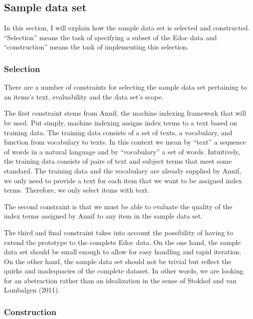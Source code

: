 \hypertarget{sample-data-set}{%
\subsection{Sample data set}\label{sample-data-set}}

In this section, I will explain how the sample data set is selected and
constructed. ``Selection'' means the task of specifying a subset of the
Edoc data and ``construction'' means the task of implementing this
selection.

\hypertarget{selection}{%
\subsubsection{Selection}\label{selection}}

There are a number of constraints for selecting the sample data set
pertaining to an items's text, evaluability and the data set's scope.

The first constraint stems from Annif, the machine indexing framework
that will be used. Put simply, machine indexing assigns index terms to a
text based on training data. The training data consists of a set of
texts, a vocabulary, and function from vocabulary to texts. In this
context we mean by ``text'' a sequence of words in a natural language
and by ``vocabulary'' a set of words. Intuitively, the training data
consists of pairs of text and subject terms that meet some standard. The
training data and the vocabulary are already supplied by Annif, we only
need to provide a text for each item that we want to be assigned index
terms. Therefore, we only select items with text.

The second constraint is that we must be able to evaluate the quality of
the index terms assigned by Annif to any item in the sample data set.

The third and final constraint takes into account the possibility of
having to extend the prototype to the complete Edoc data. On the one
hand, the sample data set should be small enough to allow for easy
handling and rapid iteration. On the other hand, the sample data set
should not be trivial but reflect the quirks and inadequacies of the
complete dataset. In other words, we are looking for an abstraction
rather than an idealization in the sense of Stokhof and van Lambalgen
(2011).

\hypertarget{construction}{%
\subsubsection{Construction}\label{construction}}

